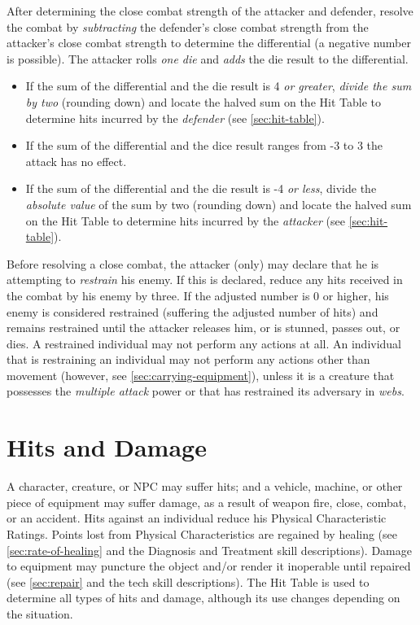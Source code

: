 After determining the close combat strength of the attacker and
defender, resolve the combat by \emph{subtracting} the defender's
close combat strength from the attacker's close combat strength to
determine the differential (a negative number is possible). The
attacker rolls \emph{one die} and \emph{adds} the die result to the
differential.

\begin{itemize}
\item If the sum of the differential and the die result is 4 \emph{or
    greater}, \emph{divide the sum by two} (rounding down) and locate
  the halved sum on the Hit Table to determine hits incurred by the
  \emph{defender} (see \ref{sec:hit-table}).
\item If the sum of the differential and the dice result ranges from
  -3 to 3 the attack has no effect. 
\item If the sum of the differential and the die result is -4 \emph{or
    less}, divide the \emph{absolute value} of the sum by two
  (rounding down) and locate the halved sum on the Hit Table to
  determine hits incurred by the \emph{attacker} (see
  \ref{sec:hit-table}).
\end{itemize}

Before resolving a close combat, the attacker (only) may declare that
he is attempting to \emph{restrain} his enemy. If this is declared,
reduce any hits received in the combat by his enemy by three. If the
adjusted number is 0 or higher, his enemy is considered restrained
(suffering the adjusted number of hits) and remains restrained until
the attacker releases him, or is stunned, passes out, or dies. A
restrained individual may not perform any actions at all. An
individual that is restraining an individual may not perform any
actions other than movement (however, see
\ref{sec:carrying-equipment}), unless it is a creature that possesses
the \emph{multiple attack} power or that has restrained its adversary
in \emph{webs}.

\section{Hits and Damage}
\label{sec:hits-and-damage}



A character, creature, or NPC may suffer hits; and a vehicle, machine,
or other piece of equipment may suffer damage, as a result of weapon
fire, close, combat, or an accident. Hits against an individual reduce
his Physical Characteristic Ratings. Points lost from Physical
Characteristics are regained by healing (see \ref{sec:rate-of-healing}
and the Diagnosis and Treatment skill descriptions). Damage to
equipment may puncture the object and/or render it inoperable until
repaired (see \ref{sec:repair} and the tech skill descriptions). The
Hit Table is used to determine all types of hits and damage, although
its use changes depending on the situation.

